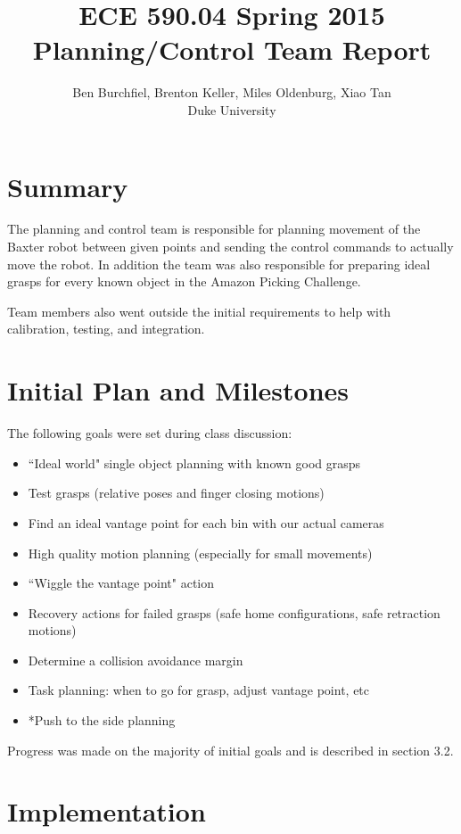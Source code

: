\documentclass[12pt]{article}
\title{ECE 590.04 Spring 2015 \\ Planning/Control Team Report}
\author{Ben Burchfiel, Brenton Keller, Miles Oldenburg, Xiao Tan\\ Duke University}
\begin{document}
\maketitle

\newpage

\tableofcontents

\newpage

\section{Summary}
The planning and control team is responsible for planning movement of the Baxter robot between given points and sending the control commands to actually move the robot. In addition the team was also responsible for preparing ideal grasps for every known object in the Amazon Picking Challenge.

Team members also went outside the initial requirements to help with calibration, testing, and integration.

\section{Initial Plan and Milestones}
The following goals were set during class discussion:

\begin{itemize}
\item ``Ideal world" single object planning with known good grasps
\item Test grasps (relative poses and finger closing motions)
\item Find an ideal vantage point for each bin with our actual cameras
\item High quality motion planning (especially for small movements)
\item ``Wiggle the vantage point" action
\item Recovery actions for failed grasps (safe home configurations, safe retraction motions)
\item Determine a collision avoidance margin
\item Task planning: when to go for grasp, adjust vantage point, etc
\item *Push to the side planning
\end{itemize}

Progress was made on the majority of initial goals and is described in section 3.2.

\section{Implementation}
\end{document}
